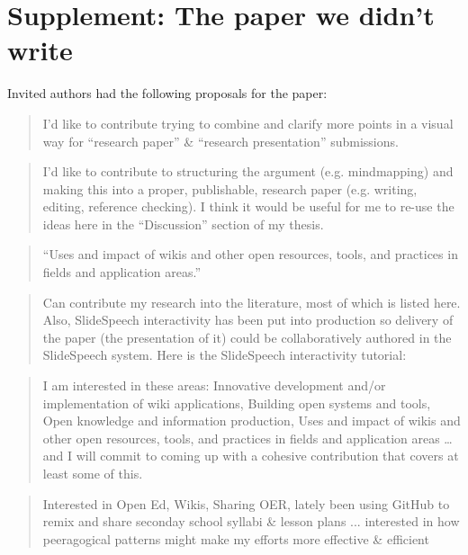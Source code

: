 \documentclass{acm_proc_article-sp}
\newenvironment{cframed}[1][blue]
  {\def\FrameCommand{\fboxsep=\FrameSep\fcolorbox{#1}{white}}%
    \MakeFramed {\advance\hsize-\width \FrameRestore}}
  {\endMakeFramed}
\begin{document}
% 

\begin{cframed}[scarlet]
\section{Supplement: The paper we didn't write}

Invited authors had the following proposals for the paper:

\begin{quote}
I'd like to contribute trying to combine and clarify more points in a
visual way for ``research paper'' \& ``research presentation''
submissions.
\end{quote}

\begin{quote}
I'd like to contribute to structuring the argument (e.g. mindmapping)
and making this into a proper, publishable, research paper
(e.g. writing, editing, reference checking). I think it would be
useful for me to re-use the ideas here in the ``Discussion'' section
of my thesis.
\end{quote}

\begin{quote}
``Uses and impact of wikis and other open resources, tools, and
  practices in fields and application areas.''
\end{quote}

\begin{quote}
Can contribute my research into the literature, most of which is
listed here. Also, SlideSpeech interactivity has been put into
production so delivery of the paper (the presentation of it) could be
collaboratively authored in the SlideSpeech system. Here is the
SlideSpeech interactivity tutorial:
\end{quote}

\begin{quote}
I am interested in these areas: Innovative development and/or implementation of wiki applications, Building open systems and tools, Open knowledge and information production, Uses and impact of wikis and other open resources, tools, and practices in fields and application areas \ldots and I will commit to coming up with a cohesive contribution that covers at least some of this.
\end{quote}

\begin{quote}
Interested in Open Ed, Wikis, Sharing OER, lately been using GitHub to remix and share seconday school syllabi \& lesson plans ... interested in how peeragogical patterns might make my efforts more effective \& efficient
\end{quote}


\end{cframed}
\end{document}
